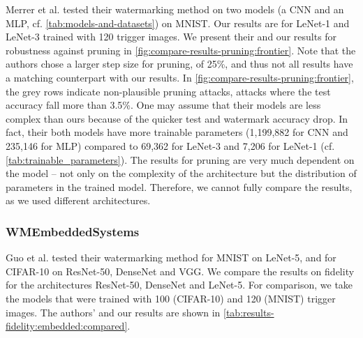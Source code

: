 Merrer et al. \cite{merrer_adversarial_2019} tested their watermarking method on two models (a CNN and an MLP, cf. \cref{tab:models-and-datasets}) on MNIST. Our results are for LeNet-1 and LeNet-3 trained with 120 trigger images. We present their and our results for robustness against pruning in \cref{fig:compare-results-pruning:frontier}. Note that the authors chose a larger step size for pruning, of 25\%, and thus not all results have a matching counterpart with our results.
In \cref{fig:compare-results-pruning:frontier}, the grey rows indicate non-plausible pruning attacks, attacks where the test accuracy fall more than 3.5\%. One may assume that their models are less complex than ours because of the quicker test and watermark accuracy drop. In fact, their both models have more trainable parameters (1,199,882 for CNN and 235,146 for MLP) compared to 69,362 for LeNet-3 and 7,206 for LeNet-1 (cf. \cref{tab:trainable_parameters}). The results for pruning are very much dependent on the model -- not only on the complexity of the architecture but the distribution of parameters in the trained model. Therefore, we cannot fully compare the results, as we used different architectures. 





\subsubsection{WMEmbeddedSystems} \label{sec:compare-results:embedded}

Guo et al. \cite{guo_watermarking_2018} tested their watermarking method for MNIST on LeNet-5, and for CIFAR-10 on ResNet-50, DenseNet and VGG. We compare the results on fidelity for the architectures ResNet-50, DenseNet and LeNet-5. For comparison, we take the models that were trained with 100 (CIFAR-10) and 120 (MNIST) trigger images. The authors' and our results are shown in \cref{tab:results-fidelity:embedded:compared}.

